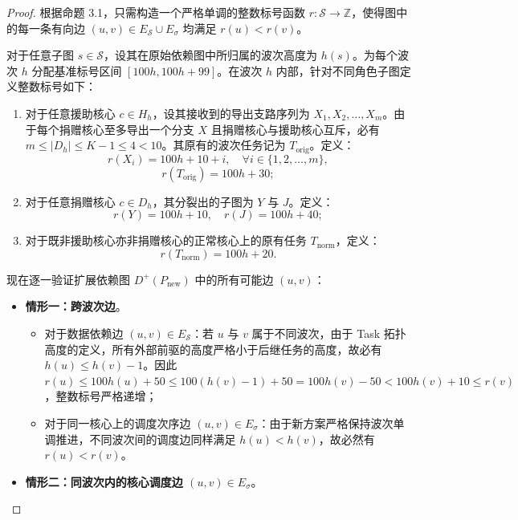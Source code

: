 \documentclass[anonymous,notoc]{gmcm2026}
\providecommand{\tightlist}{\setlength{\itemsep}{0pt}\setlength{\parskip}{0pt}}
\begin{document}
\begin{proof} 根据命题 3.1，只需构造一个严格单调的整数标号函数 \(r: \mathcal{S} \to \mathbb{Z}\)，使得图中的每一条有向边 \((u, v) \in E_{\mathcal{S}} \cup E_\sigma\) 均满足 \(r(u) < r(v)\)。

对于任意子图 \(s \in \mathcal{S}\)，设其在原始依赖图中所归属的波次高度为 \(h(s)\)。为每个波次 \(h\) 分配基准标号区间 \([100h, 100h + 99]\)。在波次 \(h\) 内部，针对不同角色子图定义整数标号如下：

\begin{enumerate}
\def\labelenumi{\arabic{enumi}.}
\tightlist
\item
  对于任意援助核心 \(c \in H_h\)，设其接收到的导出支路序列为 \(X_1, X_2, \dots, X_m\)。由于每个捐赠核心至多导出一个分支 \(X\) 且捐赠核心与援助核心互斥，必有 \(m \le |D_h| \le K - 1 \le 4 < 10\)。其原有的波次任务记为 \(T_{\mathrm{orig}}\)。定义： \begin{equation}
r(X_i) = 100h + 10 + i, \quad \forall i \in \{1, 2, \dots, m\},
\end{equation} \begin{equation}
r(T_{\mathrm{orig}}) = 100h + 30;
\end{equation}
\item
  对于任意捐赠核心 \(c \in D_h\)，其分裂出的子图为 \(Y\) 与 \(J\)。定义： \begin{equation}
r(Y) = 100h + 10, \quad r(J) = 100h + 40;
\end{equation}
\item
  对于既非援助核心亦非捐赠核心的正常核心上的原有任务 \(T_{\mathrm{norm}}\)，定义： \begin{equation}
r(T_{\mathrm{norm}}) = 100h + 20.
\end{equation}
\end{enumerate}

现在逐一验证扩展依赖图 \(D^+(P_{\mathrm{new}})\) 中的所有可能边 \((u, v)\)：

\begin{itemize}
\tightlist
\item
  \textbf{情形一：跨波次边}。

  \begin{itemize}
  \tightlist
  \item
    对于数据依赖边 \((u, v) \in E_{\mathcal{S}}\)：若 \(u\) 与 \(v\) 属于不同波次，由于 Task 拓扑高度的定义，所有外部前驱的高度严格小于后继任务的高度，故必有 \(h(u) \le h(v) - 1\)。因此 \(r(u) \le 100h(u) + 50 \le 100(h(v) - 1) + 50 = 100h(v) - 50 < 100h(v) + 10 \le r(v)\)，整数标号严格递增；
  \item
    对于同一核心上的调度次序边 \((u, v) \in E_\sigma\)：由于新方案严格保持波次单调推进，不同波次间的调度边同样满足 \(h(u) < h(v)\)，故必然有 \(r(u) < r(v)\)。
  \end{itemize}
\item
  \textbf{情形二：同波次内的核心调度边 \((u, v) \in E_\sigma\)}。


\end{itemize}
\end{proof}
\end{document}
